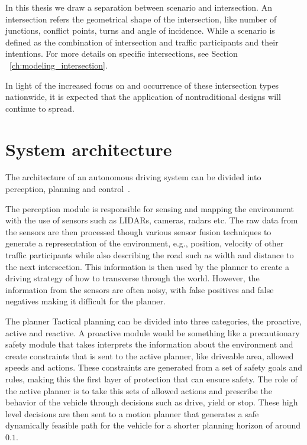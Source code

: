 In this thesis we draw a separation between scenario and intersection. An intersection refers the geometrical shape of the intersection, like number of junctions, conflict points, turns and angle of incidence. While a scenario is defined as the combination of intersection and traffic participants and their intentions. 
For more details on specific intersections, see Section ~\ref{ch:modeling_intersection}.


 In light of the increased focus on and occurrence of these intersection types nationwide, it is expected that the application of nontraditional designs will continue to spread.

 \section{System architecture}
 \label{sec:system_architecture}
 The architecture of an autonomous driving system can be divided into perception, planning and control~\cite{Schwarting2018, koretenkamp2016}. 
 
 The perception module is responsible for sensing and mapping the environment with the use of sensors such as LIDARs, cameras, radars etc. The raw data from the sensors are then processed though various sensor fusion techniques to generate a representation of the environment, e.g., position, velocity of other traffic participants while also describing the road such as width and distance to the next intersection. This information is then used by the planner to create a driving strategy of how to transverse through the world. However, the information from the sensors are often noisy, with false positives and false negatives making it difficult for the planner.
 
 The planner 
 Tactical planning can be divided into three categories, the proactive, active and reactive. A proactive module would be something like a precautionary safety module that takes interprets the information about the environment and create constraints that is sent to the active planner, like  driveable area, allowed speeds and actions. These constraints are generated from a set of safety goals and rules, making this the first layer of protection that can ensure safety. 
 The role of the active planner is to take this sets of allowed actions and prescribe the behavior of the vehicle through decisions such as drive, yield or stop. These high level decisions are then sent to a motion planner that generates a safe dynamically feasible path for the vehicle for a shorter planning horizon of around $0.1$.
 
